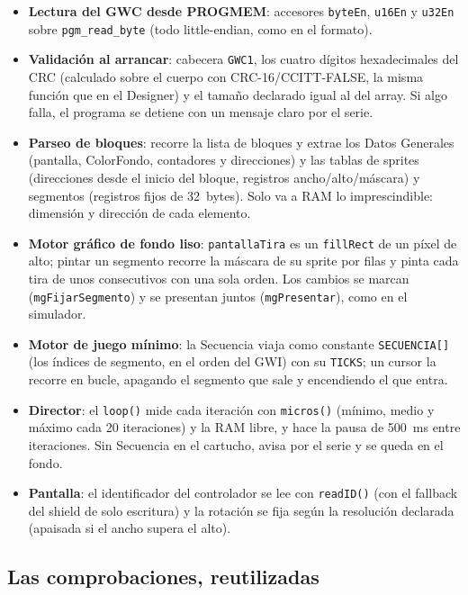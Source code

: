 \begin{itemize}
	\item \textbf{Lectura del GWC desde PROGMEM}: accesores \texttt{byteEn}, \texttt{u16En} y \texttt{u32En} sobre \texttt{pgm\_read\_byte} (todo little-endian, como en el formato).
	\item \textbf{Validación al arrancar}: cabecera \texttt{GWC1}, los cuatro dígitos hexadecimales del CRC (calculado sobre el cuerpo con CRC-16/CCITT-FALSE, la misma función que en el Designer) y el tamaño declarado igual al del array. Si algo falla, el programa se detiene con un mensaje claro por el serie.
	\item \textbf{Parseo de bloques}: recorre la lista de bloques y extrae los Datos Generales (pantalla, ColorFondo, contadores y direcciones) y las tablas de sprites (direcciones desde el inicio del bloque, registros ancho/alto/máscara) y segmentos (registros fijos de 32~bytes). Solo va a RAM lo imprescindible: dimensión y dirección de cada elemento.
	\item \textbf{Motor gráfico de fondo liso}: \texttt{pantallaTira} es un \texttt{fillRect} de un píxel de alto; pintar un segmento recorre la máscara de su sprite por filas y pinta cada tira de unos consecutivos con una sola orden. Los cambios se marcan (\texttt{mgFijarSegmento}) y se presentan juntos (\texttt{mgPresentar}), como en el simulador.
	\item \textbf{Motor de juego mínimo}: la Secuencia viaja como constante \texttt{SECUENCIA[]} (los índices de segmento, en el orden del GWI) con su \texttt{TICKS}; un cursor la recorre en bucle, apagando el segmento que sale y encendiendo el que entra.
	\item \textbf{Director}: el \texttt{loop()} mide cada iteración con \texttt{micros()} (mínimo, medio y máximo cada 20 iteraciones) y la RAM libre, y hace la pausa de 500~ms entre iteraciones. Sin Secuencia en el cartucho, avisa por el serie y se queda en el fondo.
	\item \textbf{Pantalla}: el identificador del controlador se lee con \texttt{readID()} (con el fallback del shield de solo escritura) y la rotación se fija según la resolución declarada (apaisada si el ancho supera el alto).
\end{itemize}

\subsection{Las comprobaciones, reutilizadas}
\label{sec:F6I04Comprobaciones}

